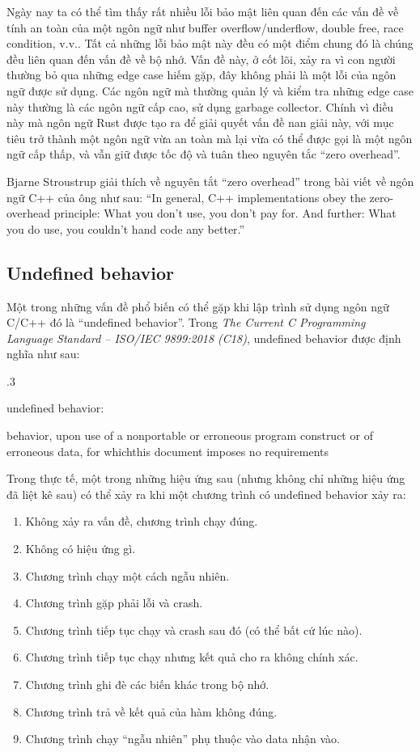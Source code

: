 Ngày nay ta có thể tìm thấy rất nhiều lỗi bảo mật liên quan đến các vấn đề về tính an toàn của một ngôn ngữ như buffer overflow/underflow, double free, race condition, v.v.. Tất cả những lỗi bảo mật này đều có một điểm chung đó là chúng đều liên quan đến vấn đề về bộ nhớ. Vấn đề này, ở cốt lõi, xảy ra vì con người thường bỏ qua những edge case hiếm gặp, đây không phải là một lỗi của ngôn ngữ được sử dụng. Các ngôn ngữ mà thường quản lý và kiểm tra những edge case này thường là các ngôn ngữ cấp cao, sử dụng garbage collector. Chính vì điều này mà ngôn ngữ Rust được tạo ra để giải quyết vấn đề nan giải này, với mục tiêu trở thành một ngôn ngữ vừa an toàn mà lại vừa có thể được gọi là một ngôn ngữ cấp thấp, và vẫn giữ được tốc độ và tuân theo nguyên tắc ``zero overhead''.

Bjarne Stroustrup giải thích về nguyên tắt ``zero overhead'' trong bài viết về ngôn ngữ C++ của ông như sau: ``In general, C++ implementations obey the zero-overhead principle: What you don’t use, you don’t pay for. And further: What you do use, you couldn’t hand code any better.''

\subsection{Undefined behavior}
Một trong những vấn đề phổ biến có thể gặp khi lập trình sử dụng ngôn ngữ C/C++ đó là ``undefined behavior''. Trong \emph{The Current C Programming Language Standard – ISO/IEC 9899:2018 (C18)}, undefined behavior được định nghĩa như sau:

.3\par
 undefined behavior:\par
 behavior, upon use of a nonportable or erroneous program construct or of erroneous data, for whichthis document imposes no requirements
\bigskip

Trong thực tế, một trong những hiệu ứng sau (nhưng không chỉ những hiệu ứng đã liệt kê sau) có thể xảy ra khi một chương trình có undefined behavior xảy ra:

\begin{enumerate}
    \item Không xảy ra vấn đề, chương trình chạy đúng.
    \item Không có hiệu ứng gì.
    \item Chương trình chạy một cách ngẫu nhiên.
    \item Chương trình gặp phải lỗi và crash.
    \item Chương trình tiếp tục chạy và crash sau đó (có thể bất cứ lúc nào).
    \item Chương trình tiếp tục chạy nhưng kết quả cho ra không chính xác.
    \item Chương trình ghi đè các biến khác trong bộ nhớ.
    \item Chương trình trả về kết quả của hàm không đúng.
    \item Chương trình chạy ``ngẫu nhiên'' phụ thuộc vào data nhận vào.
\end{enumerate}

